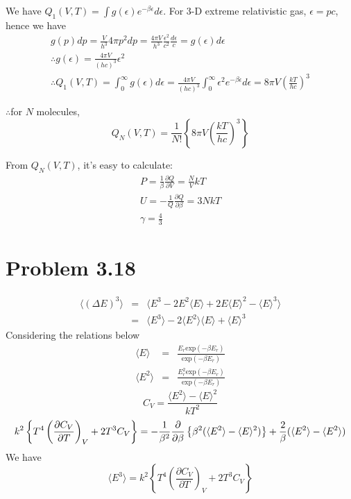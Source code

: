 \documentclass{article}
\begin{document}
	We have $Q_1(V,T)=\int g(\epsilon) e^{-\beta \epsilon}d \epsilon $. For 3-D extreme relativistic gas, $\epsilon =pc $, hence we have
	\begin{gather*}
		g(p)dp=\frac{V}{h^3}4 \pi p^2dp = \frac{4 \pi V }{h^3} \frac{\epsilon^2}{c^2} \frac{d \epsilon}{c} = g(\epsilon)d \epsilon\\
		\therefore g(\epsilon)=\frac{4 \pi V}{(hc)^3} \epsilon^2\\
		\therefore Q_1(V,T)=\int^{\infty}_0 g(\epsilon)d \epsilon=\frac{4 \pi V}{(hc)^3} \int^{\infty}_0 \epsilon^2 e^{-\beta \epsilon}d \epsilon = 8 \pi V \left( \frac{kT}{hc} \right)^3
	\end{gather*}
	
	$\therefore$for $N$ molecules,
	\begin{equation*}
		Q_N(V,T)= \frac{1}{N!}\left\{ 8 \pi V \left( \frac{kT}{hc} \right)^3\right\}
	\end{equation*}

	From $Q_N(V,T)$, it's easy to calculate:
	\begin{gather*}
		P=\frac{1}{\beta} \frac{\partial Q}{\partial V} = \frac{N}{V}kT\\
		U = -\frac{1}{Q} \frac{\partial Q}{\partial \beta}=3NkT\\
		\gamma = \frac{4}{3}
	\end{gather*}


\section*{Problem 3.18}
\begin{eqnarray*}
\langle(\Delta E)^3\rangle&=&\langle E^3-2E^2\langle E\rangle +2E\langle E\rangle ^2-\langle E\rangle ^3\rangle \\&=&\langle E^3\rangle -2\langle E^2\rangle \langle E\rangle +\langle E\rangle^3
\end{eqnarray*}
Considering the relations below
\begin{eqnarray*}
\langle E\rangle &=&\frac{E_r\mathrm{exp}(-\beta E_r)}{\mathrm{exp}(-\beta E_r)}\\
\langle E^2\rangle &=&\frac{E_r^2\mathrm{exp}(-\beta E_r)}{\mathrm{exp}(-\beta E_r)}
\end{eqnarray*}
\begin{equation*}
C_V=\frac{\langle E^2\rangle-\langle E\rangle^2}{kT^2}
\end{equation*}
\begin{equation*}
k^2\left\{T^4\left(\frac{\partial C_V}{\partial T}\right)_V+2T^3C_V\right\}=-\frac{1}{\beta^2}\frac{\partial}{\partial \beta}\left\{\beta^2(\langle E^2\rangle-\langle E\rangle^2)\right\}+\frac{2}{\beta}(\langle E^2\rangle-\langle E^2\rangle)\\
\end{equation*}
We have
\begin{equation*}
\langle E^3\rangle=k^2\left\{T^4\left(\frac{\partial C_V}{\partial T}\right)_V+2T^3C_V\right\}
\end{equation*}
\end{document}
